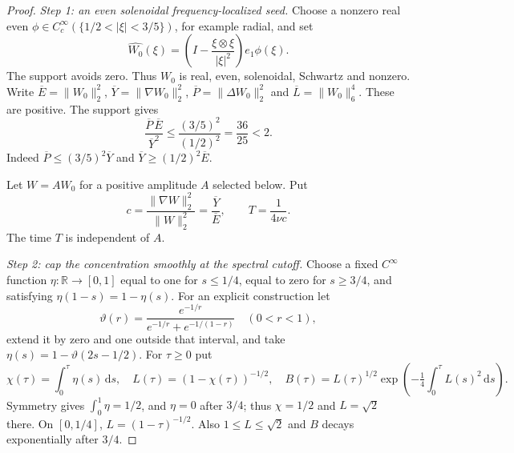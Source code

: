 \documentclass[11pt,a4paper]{article}
\theoremstyle{definition}\newtheorem{definition}[theorem]{Definition}
\theoremstyle{remark}\newtheorem{remark}[theorem]{Remark}
\newcommand{\R}{\mathbb R}
\newcommand{\dd}{\,\mathrm d}
\newcommand{\norm}[1]{\lVert #1\rVert}
\numberwithin{equation}{section}
\begin{document}
\begin{proof}
\emph{Step 1: an even solenoidal frequency-localized seed.}
Choose a nonzero real even $\phi\in C_c^\infty(\{1/2<|\xi|<3/5\})$, for example radial, and set
\[
 \widehat{W_0}(\xi)=\left(I-\frac{\xi\otimes\xi}{|\xi|^2}\right)e_1\phi(\xi).
\]
The support avoids zero. Thus $W_0$ is real, even, solenoidal, Schwartz and nonzero. Write $\overline E=\norm{W_0}_2^2$, $\overline Y=\norm{\nabla W_0}_2^2$, $\overline P=\norm{\Delta W_0}_2^2$ and $\overline L=\norm{W_0}_6^4$. These are positive. The support gives
\begin{equation}\label{eq:seedratio}
 \frac{\overline P\,\overline E}{\overline Y^2}
 \le\frac{(3/5)^2}{(1/2)^2}=\frac{36}{25}<2.
\end{equation}
Indeed $\overline P\le(3/5)^2\overline Y$ and $\overline Y\ge(1/2)^2\overline E$.

Let $W=A W_0$ for a positive amplitude $A$ selected below. Put
\begin{equation}\label{eq:cappedT}
 c=\frac{\norm{\nabla W}_2^2}{\norm W_2^2}
   =\frac{\overline Y}{\overline E},
 \qquad T=\frac1{4\nu c}.
\end{equation}
The time $T$ is independent of $A$.

\emph{Step 2: cap the concentration smoothly at the spectral cutoff.}
Choose a fixed $C^\infty$ function $\eta:\R\to[0,1]$ equal to one for $s\le1/4$, equal to zero for $s\ge3/4$, and satisfying $\eta(1-s)=1-\eta(s)$. For an explicit construction let
\[
 \vartheta(r)=\frac{e^{-1/r}}{e^{-1/r}+e^{-1/(1-r)}}\quad(0<r<1),
\]
extend it by zero and one outside that interval, and take $\eta(s)=1-\vartheta(2s-1/2)$. For $\tau\ge0$ put
\begin{equation}\label{eq:capshape}
 \chi(\tau)=\int_0^\tau\eta(s)\dd s,\quad
 L(\tau)=(1-\chi(\tau))^{-1/2},\quad
 B(\tau)=L(\tau)^{1/2}
       \exp\!\left(-\tfrac14\int_0^\tau L(s)^2\dd s\right).
\end{equation}
Symmetry gives $\int_0^1\eta=1/2$, and $\eta=0$ after $3/4$; thus $\chi=1/2$ and $L=\sqrt2$ there. On $[0,1/4]$, $L=(1-\tau)^{-1/2}$. Also $1\le L\le\sqrt2$ and $B$ decays exponentially after $3/4$.


\end{proof}
\end{document}
